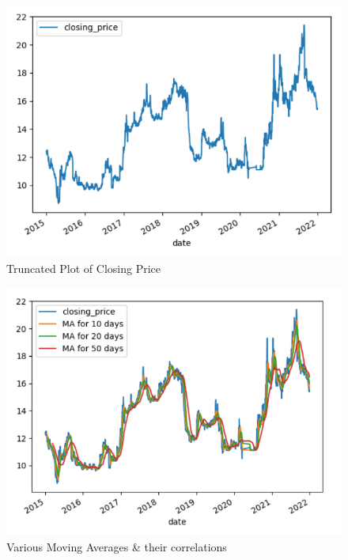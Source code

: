 \documentclass[conference]{IEEEtran}
\begin{document}
\begin{figure}[htbp]
    \centering
    \includegraphics[width=0.975\columnwidth]{fig4.png}
    \caption{Truncated Plot of Closing Price}
    \label{fig:fig4}
\end{figure}

\begin{figure}[htbp]
    \centering
    \includegraphics[width=0.975\columnwidth]{fig5.png}
    \caption{Various Moving Averages \& their correlations}
    \label{fig:fig5}
\end{figure}
\end{document}
